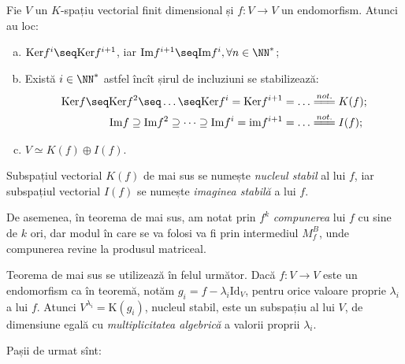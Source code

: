 \begin{theorem}\label{thm:jord}
  Fie $V$ un $K$-spațiu vectorial finit dimensional și $f : V \to V$ un
  endomorfism. Atunci au loc:
  \begin{enumerate}[(a)]
  \item $\mathrm{Ker}f^i \seq \mathrm{Ker}f^{i + 1}$, iar
    $\mathrm{Im}f^{i+1} \seq \mathrm{Im}f^i, \forall n \in \NN^\ast$;
  \item Există $i \in \NN^\ast$ astfel încît șirul de incluziuni se stabilizează:
    \begin{align*}
      \mathrm{Ker}f \seq \mathrm{Ker}f^2 \seq \dots \seq \mathrm{Ker}f^i = \mathrm{Ker}f^{i+1}
      = \dots &\stackrel{not.}{=\joinrel=\joinrel=} K(f); \\
      \mathrm{Im}f \supseteq \mathrm{Im}f^2 \supseteq \dots \supseteq \mathrm{Im}f^i =
      \mathrm{im}f^{i+1} = \dots &\stackrel{not.}{=\joinrel=\joinrel=} I(f);
    \end{align*}
  \item $V \simeq K(f) \oplus I(f)$.
  \end{enumerate}
\end{theorem}

\begin{definition}\label{def:stabil}
  Subspațiul vectorial $K(f)$ de mai sus se numește \emph{nucleul stabil} al lui $f$, iar
  subspațiul vectorial $I(f)$ se numește \emph{imaginea stabilă} a lui $f$.
\end{definition}

De asemenea, în teorema de mai sus, am notat prin $f^k$ \emph{compunerea} lui $f$ cu sine
de $k$ ori, dar modul în care se va folosi va fi prin intermediul $M_f^B$, unde compunerea
revine la produsul matriceal.

Teorema de mai sus se utilizează în felul următor. Dacă $f : V \to V$ este un endomorfism
ca în teoremă, notăm $g_i = f - \lambda_i \mathrm{Id}_V$, pentru orice valoare proprie $\lambda_i$
a lui $f$. Atunci $V^{\lambda_i} = \mathrm{K}(g_i)$, nucleul stabil, este un subspațiu
al lui $ V $, de dimensiune egală cu \emph{multiplicitatea algebrică} a valorii proprii $ \lambda_i $.

Pașii de urmat sînt:

